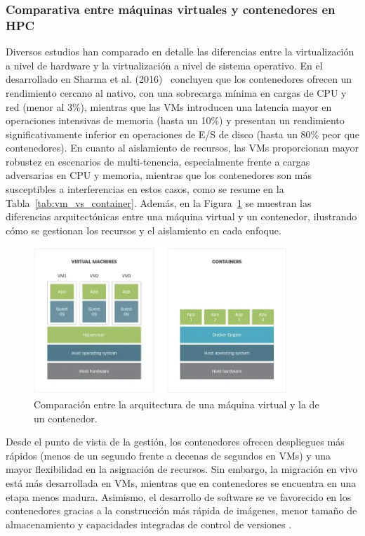 \subsubsection{Comparativa entre máquinas virtuales y contenedores en \acs{HPC}}

Diversos estudios han comparado en detalle las diferencias entre la virtualización a nivel de hardware y la virtualización a nivel de sistema operativo. En el desarrollado en Sharma et al. (2016)~\cite{sharma2016containers} concluyen que los contenedores ofrecen un rendimiento cercano al nativo, con una sobrecarga mínima en cargas de CPU y red (menor al 3\%), mientras que las VMs introducen una latencia mayor en operaciones intensivas de memoria (hasta un 10\%) y presentan un rendimiento significativamente inferior en operaciones de E/S de disco (hasta un 80\% peor que contenedores). En cuanto al aislamiento de recursos, las VMs proporcionan mayor robustez en escenarios de multi-tenencia, especialmente frente a cargas adversarias en CPU y memoria, mientras que los contenedores son más susceptibles a interferencias en estos casos, como se resume en la Tabla~\ref{tab:vm_vs_container}. Además, en la Figura~\ref{fig:vm_vs_container} se muestran las diferencias arquitectónicas entre una máquina virtual y un contenedor, ilustrando cómo se gestionan los recursos y el aislamiento en cada enfoque.

\begin{figure}[ht]
    \centering
    \includegraphics[width=0.85\textwidth]{imagenes/cap3/maquina-virtual-vs-contenedor.png}
    \caption[Comparación entre la arquitectura de una máquina virtual y la de un contenedor.]{Comparación entre la arquitectura de una máquina virtual y la de un contenedor. \cite{electronicaonline_vm}}
    \label{fig:vm_vs_container}
\end{figure}

Desde el punto de vista de la gestión, los contenedores ofrecen despliegues más rápidos (menos de un segundo frente a decenas de segundos en VMs) y una mayor flexibilidad en la asignación de recursos. Sin embargo, la migración en vivo está más desarrollada en VMs, mientras que en contenedores se encuentra en una etapa menos madura. Asimismo, el desarrollo de software se ve favorecido en los contenedores gracias a la construcción más rápida de imágenes, menor tamaño de almacenamiento y capacidades integradas de control de versiones \cite{sharma2016containers}.

